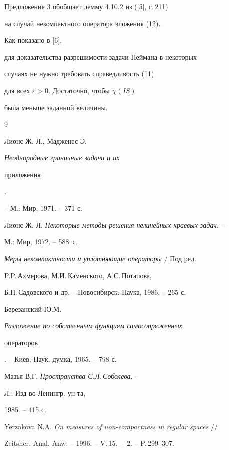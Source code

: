  


\begin{note} 


Предложение 3 обобщает лемму 4.10.2 из ([5], с.\,211) 


на случай некомпактного оператора вложения (12). 


\end{note} 


 


Как показано в [6], 


для доказательства разрешимости задачи Неймана в некоторых  


случаях не нужно требовать справедливость (11) 


для всех $\varepsilon>0$. Достаточно, чтобы $\chi(IS)$ 


была меньше заданной величины. 


 


\begin{thebibliography}{9} 


 




Лионс Ж.-Л., Мадженес Э. {\em Неоднородные граничные задачи и их 


приложения}. 


-- М.: Мир, 1971. -- 371 с. 




Лионс Ж.-Л. {\em Некоторые методы решения нелинейных краевых задач}. -- 


М.: Мир, 1972. -- 588~с. 




{\em Меры некомпактности и уплотняющие операторы} / Под ред. 


P.P.\,Ахмерова, М.И.\,Каменского, А.С.\,Потапова,


Б.Н.\,Садовского и др. -- Новосибирск: Наука, 1986. -- 265 с. 




Березанский Ю.М. {\em Разложение по собственным функциям самосопряженных  


операторов}. -- Киев: Наук. думка, 1965. -- 798 с. 




Мазья В.Г. {\em Пространства С.Л.\,Соболева}. -- 


Л.: Изд-во Ленингр. ун-та, 


1985. -- 415 с. 




Yerzakova N.A. {\em On measures of non-compactness in regular spaces} // 


Zeitshcr. Anal. Anw. -- 1996. -- V.\,15. -- \No\,2. -- P.\,299--307. 


 


\end{thebibliography} 


